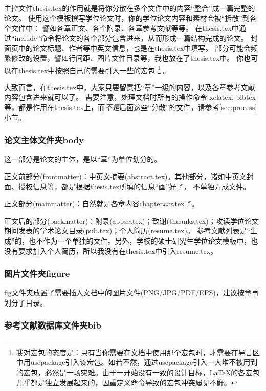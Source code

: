 主控文件thesis.tex的作用就是将你分散在多个文件中的内容``整合''成一篇完整的论文。
使用这个模板撰写学位论文时，你的学位论文内容和素材会被``拆散''到各个文件中：
譬如各章正文、各个附录、各章参考文献等等。
在thesis.tex中通过``include''命令将论文的各个部分包含进来，从而形成一篇结构完成的论文。
封面页中的论文标题、作者等中英文信息，也是在thesis.tex中填写。
部分可能会频繁修改的设置，譬如行间距、图片文件目录等，我也放在了thesis.tex中。
你也可以在thesis.tex中按照自己的需要引入一些的宏包
\footnote{我对宏包的态度是：只有当你需要在文档中使用那个宏包时，才需要在导言区中用usepackage引入该宏包。如若不然，通过usepackage引入一大堆不被用到的宏包，必然是一场灾难。由于一开始没有一致的设计目标，\LaTeX 的各宏包几乎都是独立发展起来的，因重定义命令导致的宏包冲突屡见不鲜。}
。

大致而言，在thesis.tex中，大家只要留意把``章''一级的内容，以及各章参考文献内容包含进来就可以了。
需要注意，处理文档时所有的操作命令 \cndash{} xelatex, bibtex等，都是作用在thesis.tex上，而\emph{不是}后面这些``分散''的文件，请参考\ref{sec:process}小节。

\subsubsection{论文主体文件夹body}
\label{sec:thesisbody}

这一部分是论文的主体，是以``章''为单位划分的。

正文前部分(frontmatter)：中英文摘要(abstract.tex)。其他部分，诸如中英文封面、授权信息等，都是根据thesis.tex所填的信息``画''好了，
不单独弄成文件。

正文部分(mainmatter)：自然就是各章内容chapter\emph{xxx}.tex了。

正文后的部分(backmatter)：附录(app\emph{xx}.tex)；致谢(thuanks.tex)；攻读学位论文期间发表的学术论文目录(pub.tex)；个人简历(resume.tex)。
参考文献列表是``生成''的，也不作为一个单独的文件。另外，学校的硕士研究生学位论文模板中，也没有要求加入个人简历，所以我没有在thesis.tex中引入resume.tex。

\subsubsection{图片文件夹figure}
\label{sec:fig}

fig文件夹放置了需要插入文档中的图片文件(PNG/JPG/PDF/EPS)，建议按章再划分子目录。

\subsubsection{参考文献数据库文件夹bib}
\label{sec:bib}

